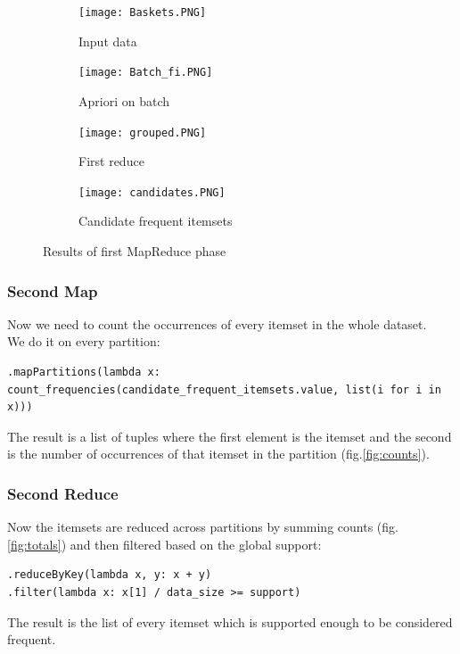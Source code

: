 \documentclass[a4paper]{article}
\begin{document}
	\begin{figure}[h]
		\centering
		
		\begin{subfigure}[b]{0.24\textwidth}
			\centering
			\texttt{[image: Baskets.PNG]}
         	\caption{Input data}
         	\label{fig:input_data}
		\end{subfigure}
		\hfill
		\begin{subfigure}[b]{0.24\textwidth}
			\centering
			\texttt{[image: Batch\_fi.PNG]}
         	\caption{Apriori on batch}
         	\label{fig:apriori}
		\end{subfigure}
		\hfill
		\begin{subfigure}[b]{0.24\textwidth}
			\centering
			\texttt{[image: grouped.PNG]}
         	\caption{First reduce}
         	\label{fig:grouped}
		\end{subfigure}
		\hfill
		\begin{subfigure}[b]{0.24\textwidth}
			\centering
			\texttt{[image: candidates.PNG]}
         	\caption{Candidate frequent itemsets}
         	\label{fig:candidate_fi}
		\end{subfigure}
	\caption{Results of first MapReduce phase}
	\end{figure}
	
	\subsubsection{Second Map}
	Now we need to count the occurrences of every itemset in the whole dataset.\\
	We do it on every partition:
	\begin{lstlisting}
.mapPartitions(lambda x: count_frequencies(candidate_frequent_itemsets.value, list(i for i in x)))
\end{lstlisting}
	The result is a list of tuples where the first element is the itemset and the second is the number of occurrences of that itemset in the partition (fig.\ref{fig:counts}).
	
	\subsubsection{Second Reduce}
	Now the itemsets are reduced across partitions by summing counts (fig.\ref{fig:totals}) and then filtered based on the global support:
	\begin{lstlisting}
.reduceByKey(lambda x, y: x + y)
.filter(lambda x: x[1] / data_size >= support)
\end{lstlisting}
	The result is the list of every itemset which is supported enough to be considered frequent.
	
\end{document}
